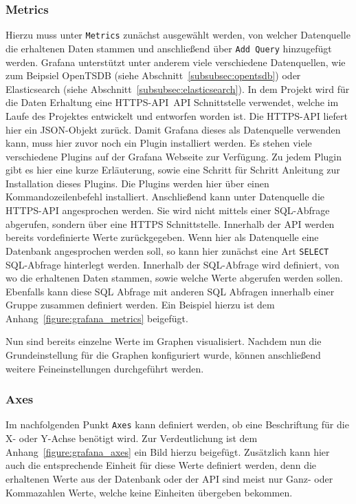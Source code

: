 \subsubsection{Metrics}
Hierzu muss unter \texttt{Metrics} zunächst ausgewählt werden, von welcher
Datenquelle die erhaltenen Daten stammen und anschließend über \texttt{Add
Query} hinzugefügt werden. Grafana unterstützt unter anderem viele verschiedene
Datenquellen, wie zum Beipsiel OpenTSDB (siehe
Abschnitt~\ref{subsubsec:opentsdb}) oder Elasticsearch (siehe
Abschnitt~\ref{subsubsec:elasticsearch}). In dem Projekt wird für die Daten
Erhaltung eine HTTPS-API~\gls{API} Schnittstelle verwendet, welche im Laufe des
Projektes entwickelt und entworfen worden ist. Die HTTPS-API liefert hier ein
\gls{JSON}-Objekt zurück. Damit Grafana dieses als Datenquelle verwenden kann,
muss hier zuvor noch ein Plugin installiert werden. Es stehen viele
verschiedene Plugins auf der Grafana Webseite zur Verfügung. Zu jedem Plugin
gibt es hier eine kurze Erläuterung, sowie eine Schritt für Schritt Anleitung
zur Installation dieses Plugins. Die Plugins werden hier über einen
Kommandozeilenbefehl installiert. Anschließend kann unter Datenquelle die
HTTPS-API angesprochen werden. Sie wird nicht mittels einer SQL-Abfrage
abgerufen, sondern über eine \gls{HTTPS} Schnittstelle. Innerhalb der API
werden bereits vordefinierte Werte zurückgegeben. Wenn hier als Datenquelle
eine Datenbank angesprochen werden soll, so kann hier zunächst eine Art
\texttt{SELECT} \gls{SQL}-Abfrage hinterlegt werden. Innerhalb der SQL-Abfrage
wird definiert, von wo die erhaltenen Daten stammen, sowie welche Werte
abgerufen werden sollen. Ebenfalls kann diese SQL Abfrage mit anderen SQL
Abfragen innerhalb einer Gruppe zusammen definiert werden. Ein Beispiel hierzu
ist dem Anhang~\ref{figure:grafana_metrics} beigefügt.

Nun sind bereits einzelne Werte im Graphen visualisiert. Nachdem nun
die Grundeinstellung für die Graphen konfiguriert wurde, können anschließend
weitere Feineinstellungen durchgeführt werden.
\mr%

\subsubsection{Axes}
Im nachfolgenden Punkt \texttt{Axes} kann definiert werden, ob eine
Beschriftung für die X- oder Y-Achse benötigt wird. Zur Verdeutlichung ist dem
Anhang~\ref{figure:grafana_axes} ein Bild hierzu beigefügt. Zusätzlich kann
hier auch die entsprechende Einheit für diese Werte definiert werden, denn die
erhaltenen Werte aus der Datenbank oder der API sind meist nur Ganz- oder
Kommazahlen Werte, welche keine Einheiten übergeben bekommen.
\mr%

